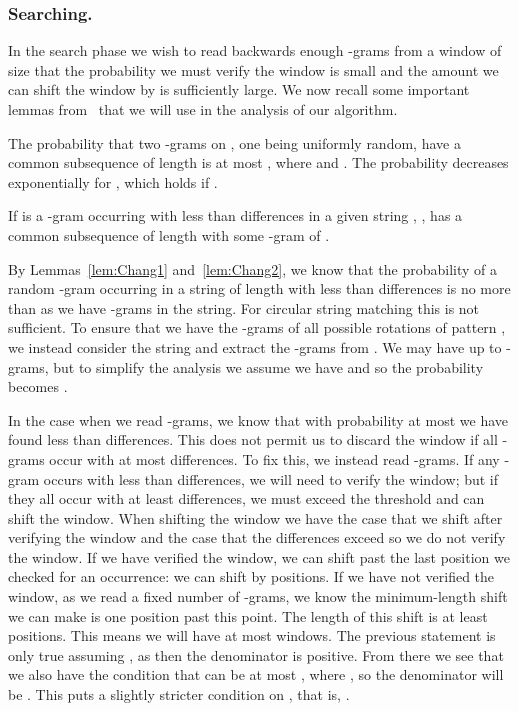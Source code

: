 \documentclass[runningheads, envcountsame, a4paper]{llncs}\usepackage{etex}
\begin{document}
\subsubsection*{Searching.}
In the search phase we wish to read backwards enough -grams from a window of size  that the probability we must verify the window is small and the amount we can shift the window by is sufficiently large.
We now recall some important lemmas from~\cite{Chang} that we will use in the analysis of our algorithm.


\begin{lemma}\label{lem:prob}
The probability that two -grams on , one being uniformly random, have a common subsequence of length  is 
at most , where  and . The probability decreases exponentially for , which holds if .
\label{lem:Chang1}
\end{lemma}
\begin{lemma}
If  is a -gram occurring with less than  differences in a given string , ,  has a common subsequence of length  with some -gram of .
\label{lem:Chang2}
\end{lemma}
By Lemmas~\ref{lem:Chang1} and~\ref{lem:Chang2}, we know that the probability of a random -gram occurring in a string of length  with less than  differences is no more than  as we have  -grams in the string. For circular string matching this is not sufficient. To ensure that we have the -grams of all possible rotations of pattern , we instead consider the string  and extract the -grams from . We may have up to  -grams, but to simplify the analysis we assume we have  and so the probability becomes . 

In the case when we read  -grams, we know that with probability at most  we have found less than  differences. This does not permit us to discard the window if all -grams occur with at most  differences. To fix this, we instead read  -grams. If any -gram occurs with less than  differences, we will need to verify the window; but if they all occur with at least  differences, we must exceed the threshold  and can shift the window. When shifting the window we have the case that we shift after verifying the window and the case that the differences exceed  so we do not verify the window. If we have verified the window, we can shift past the last position we checked for an occurrence: we can shift by  positions. If we have not verified the window, as we read a fixed number of -grams, we know the minimum-length shift we can make is one position past this point. The length of this shift is at least  positions. This 
means 
we will have at most  windows. The previous statement is only true assuming , as then the denominator is positive. From there we see that we also have the condition that  can be at most , 
where , so the denominator will be . This puts a slightly stricter condition on , that is, .
\end{document}
